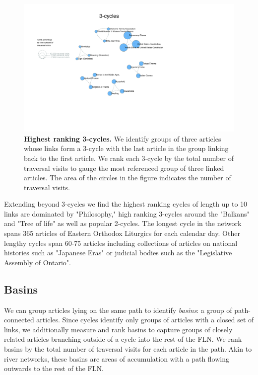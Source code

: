 \documentclass[pre,twocolumn,twoside,superscriptaddress,floatfix, aps, 10pt]{revtex4-1}
\begin{document}
\begin{figure}[tp!]
  \centering	
  \includegraphics[width=\textwidth]{graphics/3_cycles.pdf}
  \caption{
    \textbf{Highest ranking 3-cycles.}
    We identify groups of three articles whose links form a 3-cycle with the 
    last article in the group linking back to the first article.
    We rank each 3-cycle by the total number of traversal visits to gauge
    the most referenced group of three linked articles. 
    The area of the circles in the figure indicates the number of traversal visits. 
  }
  \label{fig:3-cycles}
\end{figure}

Extending beyond 3-cycles we find the highest ranking cycles of length 
up to 10 links are dominated by "Philosophy," high ranking 3-cycles
around the "Balkans" and "Tree of life" as well as popular 2-cycles.
The longest cycle in the network spans 365 articles of Eastern Orthodox Liturgics for each calendar day.
Other lengthy cycles span 60-75 articles including collections of articles on national histories such as "Japanese Eras" 
or judicial bodies such as the "Legislative Assembly of Ontario".





\subsection{Basins}

We can group articles lying on the same path to identify {\it basins}: 
a group of path-connected articles.
Since cycles identify only groups of articles with a closed set of links, 
we additionally measure and rank basins to capture groups of closely related
articles branching outside of a cycle into the rest of the FLN.
We rank basins by the total number of traversal visits for each article in the path. 
Akin to river networks, these basins are areas of accumulation with a path 
flowing outwards to the rest of the FLN.
\end{document}

